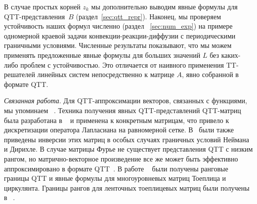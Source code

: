 В случае простых корней $z_k$ мы дополнительно выводим явные формулы для QTT-представления~$B$ (раздел~\ref{sec:qtt_repr}).
Наконец, мы проверяем устойчивость наших формул численно (раздел ~\ref{sec:num_exp}) на примере одномерной краевой задачи конвекции-реакции-диффузии с периодическими граничными условиями.
Численные результаты показывают, что мы можем применять предложенные явные формулы для больших значений $L$ без каких-либо проблем с устойчивостью.
Это отличается от наивного применения TT-решателей линейных систем непосредственно к матрице $A$, явно собранной в формате QTT.




\emph{Связанная работа}. Для QTT-аппроксимации векторов, связанных с функциями, мы упоминаем ~\cite{khor-qtt-2011,dk-qtt-tucker-2013,gras-tenz-2010,vysotsky2021tt}.
Техника получения явных QTT-представлений QTT-матриц была разработана в ~\cite{khkaz-lap-2012} и применена к конкретным матрицам, что привело к дискретизации оператора Лапласиана на равномерной сетке.
В~\cite{khkaz-lap-2012} были также приведены инверсии этих матриц в особых случаях граничных условий Неймана и Дирихле.
В случае матрицы Фурье не существует представления QTT с низким рангом, но матрично-векторное произведение все же может быть эффективно аппроксимировано в формате QTT~\cite{dks-ttfft-2012}.
В работе ~\cite{khkaz-conv-2013} были получены ранговые границы QTT и явные формулы для многоуровневых матриц Тоеплица и циркулянта.
Границы рангов для ленточных тоеплицевых матриц были получены в ~\cite{otz-teninv-2011}.


